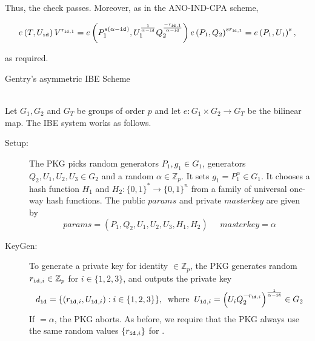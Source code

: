 Thus, the check passes. Moreover, as in the ANO-IND-CPA scheme,

\begin{equation*}
 e \left( T, U_{\mathtt{id}_{}} \right) V^{r_{ \mathtt{id}_{},1}} = e \left( P_1^{s\left( \alpha - \mathtt{id}_{} \right)}, U_1^{\frac{1}{\alpha - \mathtt{id}_{}}} Q_2^{\frac{- r_{\mathtt{id}_{},1}}{\alpha - \mathtt{id}_{}}} \right) e \left( P_1, Q_2 \right)^{s r_{\mathtt{id}_{},1}} = e \left( P_1, U_1\right)^s,
\end{equation*}

as required.

\begin{algorithm}
\caption{Gentry's asymmetric IBE Scheme~\cite{art:Gentry06}}
\label{alg:gentrys_scheme}
~\\
Let $G_1 , G_2$ and $G_T$ be groups of order $p$ and let $e : G_1 \times G_2 \rightarrow G_T$ be the bilinear map. The IBE system works as follows.

\begin{description}
\item[Setup:] The PKG picks random generators $P_1, g_1 \in G_1$, generators $Q_2, U_1, U_2, U_3 \in G_2$ and a random $\alpha \in \mathbb{Z}_p$. It sets $g_1 = P_1^{\alpha} \in G_1$. It chooses a hash function $H_1$ and $H_2: \{ 0,1 \}^* \rightarrow \{ 0 , 1 \}^n$ from a family of universal one-way hash functions. The public $params$ and private $masterkey$ are given by
\begin{equation*}
 params = \left( P_1,Q_2,U_1,U_2,U_3,H_1,H_2\right) \; \; \; \; \; masterkey = \alpha
\end{equation*}

\item[KeyGen:] To generate a private key for identity \id{} $\in \mathbb{Z}_p$, the PKG generates random $r_{\mathtt{id}_{},i} \in \mathbb{Z}_p$ for $i \in \{1,2,3\}$, and outputs the private key
\begin{equation*}
 d_{\mathtt{id}_{}} = \{ \left( r_{\mathtt{id}_{},i}, U_{\mathtt{id}_{},i} \right) : i \in \{ 1, 2, 3\}\}, \; \; \textrm{where} \; \; U_{\mathtt{id}_{},i} = \left( U_{i}Q_2^{-r_{\mathtt{id}_{},i}} \right)^{\frac{1}{\alpha-\mathtt{id}_{}}} \in G_2
\end{equation*}
If \id{} $ = \alpha $, the PKG aborts. As before, we require that the PKG always use the same random values $\{r_{\mathtt{id}_{},i}\}$ for \id{}.


\end{description}
\end{algorithm}
